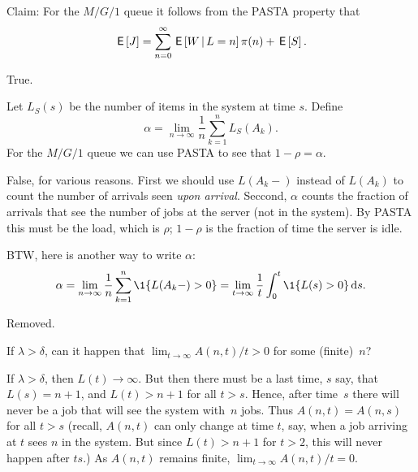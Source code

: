 \documentclass[stochastic-or.tex]{subfiles}
\begin{document}
\begin{truefalse}
Claim: For the $M/G/1$ queue it follows from the PASTA property that
 \begin{equation*}
\,\mathsf{E}\left[J\right] = \sum_{n=0}^\infty \,\mathsf{E}\left[W \,\middle|\, L=n\right] \pi(n) + \,\mathsf{E}\left[S\right].
 \end{equation*}
\begin{solution}
True.
\end{solution}
\end{truefalse}

\begin{truefalse}
Let $L_{S}(s)$ be the number of items in the system at time $s$.
Define
\begin{equation*}
\alpha = \lim_{n\to\infty} \frac 1 n \sum_{k=1}^n L_{S}(A_k).
\end{equation*}
For the $M/G/1$ queue we can use PASTA to see that $1-\rho = \alpha$.
\begin{solution} False, for various reasons. First we should use  $L(A_{k}-)$ instead of $L(A_{k})$ to count the number of arrivals seen \emph{upon arrival}.  Seccond, $\alpha$ counts the fraction of arrivals that see the number of jobs at the server (not in the system). By PASTA this must be the load, which is $\rho$; $1-\rho$ is the fraction of time the server is idle.

BTW, here is another way to write $\alpha$:
\begin{equation*}
\alpha = \lim_{n\to\infty} \frac 1 n \sum_{k=1}^n \1{L(A_k-) > 0} = \lim_{t\to\infty} \frac{1}{t}\int_0^{t} \1{L(s) > 0}\d s.
\end{equation*}
\end{solution}
\end{truefalse}

\begin{exercise}\label{ex:36}
Removed.
\end{exercise}

\begin{exercise} \label{ex:38}
If $\lambda>\delta$, can it happen that $ \lim_{t\to\infty} A(n,t)/t > 0$ for some (finite)~$n$?
\begin{solution}
If $\lambda > \delta$, then $L(t)\to\infty$.
But then there must be a last time, $s$ say, that $L(s) = n+1$, and $L(t) > n+1$ for all $t>s$.
Hence, after time~$s$ there will never be a job that will see the system with~$n$ jobs.
Thus $A(n,t) = A(n,s)$ for all $t>s$ (recall, $A(n,t)$ can only change at time $t$, say, when a job arriving at $t$ sees $n$ in the system.
But since $L(t) > n+1$ for $t>2$, this will never happen after $ts$.)
As $A(n,t)$ remains finite, $\lim_{t\to\infty}A(n,t)/t=0$.
\end{solution}
\end{exercise}
\end{document}
